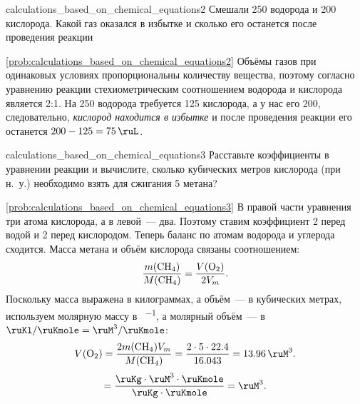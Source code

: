 \begin{problem}{}{calculations_based_on_chemical_equations2}
    Смешали \qty{250}{\ruL} водорода и \qty{200}{\ruL} кислорода. Какой газ оказался в избытке и сколько его останется после проведения реакции
    \begin{sol}{\ref{prob:calculations_based_on_chemical_equations2}}
        Объёмы газов при одинаковых условиях пропорциональны количеству вещества, поэтому согласно уравнению реакции стехиометрическим соотношением водорода и кислорода является 2:1. На \qty{250}{\ruL} водорода требуется \qty{125}{\ruL} кислорода, а у нас его \qty{200}{\ruL}, следовательно, \emph{кислород находится в избытке} и после проведения реакции его останется $200 - 125 = \qty{75}{\ruL}$.
    \end{sol}
\end{problem}

\begin{problem}{}{calculations_based_on_chemical_equations3}
    Расставьте коэффициенты в уравнении реакции и вычислите, сколько кубических метров кислорода (при н.~у.) необходимо взять для сжигания \qty{5}{\ruKg} метана?    
    \begin{sol}{\ref{prob:calculations_based_on_chemical_equations3}}
        В правой части уравнения три атома кислорода, а в левой~--- два. Поэтому ставим коэффициент 2 перед водой и 2 перед кислородом. Теперь баланс по атомам водорода и углерода сходится.
        Масса метана и объём кислорода связаны соотношением:
        \begin{equation*}
            \frac{m(\ce{CH4})}{M(\ce{CH4})} = \frac{V(\ce{O2})}{2V_m}.
        \end{equation*}
        Поскольку масса выражена в килограммах, а объём~--- в кубических метрах, используем молярную массу в \unit{\ruKg\per\ruKmole}, а молярный объём~--- в $\unit{\ruKl\per\ruKmole} = \unit{\ruM^3\per\ruKmole}$:
        \begin{equation*}
            V(\ce{O2}) = \frac{2m(\ce{CH4})V_m}{M(\ce{CH4})} = \frac{2 \cdot 5 \cdot \num{22,4}}{\num{16,043}} = \qty{13,96}{\ruM^3}.
        \end{equation*}
        \begin{equation*}
            [V(\ce{O2})] = \frac{\unit{\cancel\ruKg} \cdot \unit{\ruM^3} \cdot \unit{\cancel\ruKmole}}{\unit{\cancel\ruKg} \cdot \unit{\cancel\ruKmole}} = \unit{\ruM^3}.
        \end{equation*}
    \end{sol}
\end{problem}

